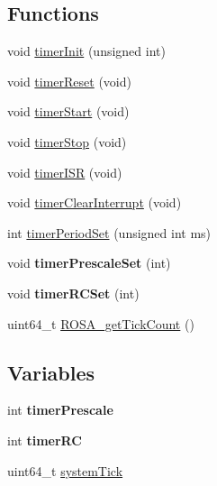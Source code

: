 \subsection*{Functions}
\begin{DoxyCompactItemize}
\item 
void \hyperlink{group__rosa__kernel_gaafc10ed8e6d779950f08c99bf73bd870}{timer\+Init} (unsigned int)
\item 
void \hyperlink{group__rosa__kernel_gaef18457fbdd2b6fd2a430989b250f08e}{timer\+Reset} (void)
\item 
void \hyperlink{group__rosa__kernel_ga460ea0ec0bdf63d412805f039f31422b}{timer\+Start} (void)
\item 
void \hyperlink{group__rosa__kernel_ga503b2997417efba54180da60b6103dc4}{timer\+Stop} (void)
\item 
void \hyperlink{group__rosa__kernel_ga652c85c18e3a82a8fdd9ccd5bc1abd47}{timer\+I\+S\+R} (void)
\item 
void \hyperlink{group__rosa__kernel_ga5815baba2cdc7d96779654ff22aea0e8}{timer\+Clear\+Interrupt} (void)
\item 
int \hyperlink{group__rosa__kernel_gae8725c012e37d97de42e87ba11dd78ea}{timer\+Period\+Set} (unsigned int ms)
\item 
\hypertarget{group__rosa__kernel_gadb107fcb9b0e723a7405f4b2cceca544}{}void {\bfseries timer\+Prescale\+Set} (int)\label{group__rosa__kernel_gadb107fcb9b0e723a7405f4b2cceca544}

\item 
\hypertarget{group__rosa__kernel_ga8e7b967b8a0d05b145f67755747cf96c}{}void {\bfseries timer\+R\+C\+Set} (int)\label{group__rosa__kernel_ga8e7b967b8a0d05b145f67755747cf96c}

\item 
uint64\+\_\+t \hyperlink{group__rosa__kernel_gab3203f81efe9789a5c105b4fccac00d6}{R\+O\+S\+A\+\_\+get\+Tick\+Count} ()
\end{DoxyCompactItemize}
\subsection*{Variables}
\begin{DoxyCompactItemize}
\item 
\hypertarget{group__rosa__kernel_ga4aa1b2e5cc4802a60c03fc3ee4a9f82e}{}int {\bfseries timer\+Prescale}\label{group__rosa__kernel_ga4aa1b2e5cc4802a60c03fc3ee4a9f82e}

\item 
\hypertarget{group__rosa__kernel_ga96884f1b6909e157aa3e523d02e2fc86}{}int {\bfseries timer\+R\+C}\label{group__rosa__kernel_ga96884f1b6909e157aa3e523d02e2fc86}

\item 
uint64\+\_\+t \hyperlink{group__rosa__kernel_gaa30c6cd3ff8db15db9aba92ff0203e7b}{system\+Tick}
\end{DoxyCompactItemize}


